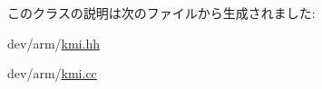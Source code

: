 このクラスの説明は次のファイルから生成されました:\begin{DoxyCompactItemize}
\item 
dev/arm/\hyperlink{kmi_8hh}{kmi.hh}\item 
dev/arm/\hyperlink{kmi_8cc}{kmi.cc}\end{DoxyCompactItemize}
